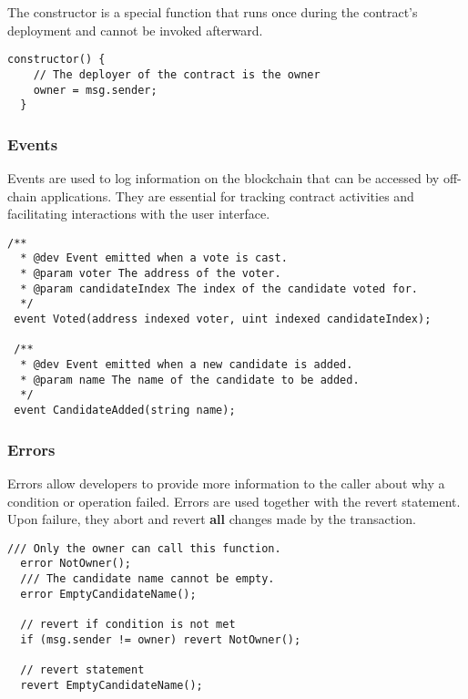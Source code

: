 \documentclass[12pt]{article}
\begin{document}
The constructor is a special function that runs once during the contract's deployment and cannot be invoked afterward.

\noindent
\begin{minipage}[c]{\textwidth}
\begin{lstlisting}[language=Solidity]
  constructor() {
    // The deployer of the contract is the owner
    owner = msg.sender;
  }
\end{lstlisting}
\end{minipage}

\subsubsection*{Events}

Events are used to log information on the blockchain that can be accessed by off-chain applications. They are essential for tracking contract activities and facilitating interactions with the user interface.

\noindent
\begin{minipage}[c]{\textwidth}
\begin{lstlisting}[language=Solidity]
  /**
  * @dev Event emitted when a vote is cast.
  * @param voter The address of the voter.
  * @param candidateIndex The index of the candidate voted for.
  */
 event Voted(address indexed voter, uint indexed candidateIndex);

 /**
  * @dev Event emitted when a new candidate is added.
  * @param name The name of the candidate to be added.
  */
 event CandidateAdded(string name);
\end{lstlisting}
\end{minipage}

\subsubsection*{Errors}

Errors allow developers to provide more information to the caller about why a condition or operation failed. Errors are used together with the revert statement. Upon failure, they abort and revert \textbf{all} changes made by the transaction.

\noindent
\begin{minipage}[c]{\textwidth}
\begin{lstlisting}[language=Solidity]
  /// Only the owner can call this function.
  error NotOwner();
  /// The candidate name cannot be empty.
  error EmptyCandidateName();

  // revert if condition is not met
  if (msg.sender != owner) revert NotOwner();

  // revert statement
  revert EmptyCandidateName();
\end{lstlisting}
\end{minipage}
\end{document}
